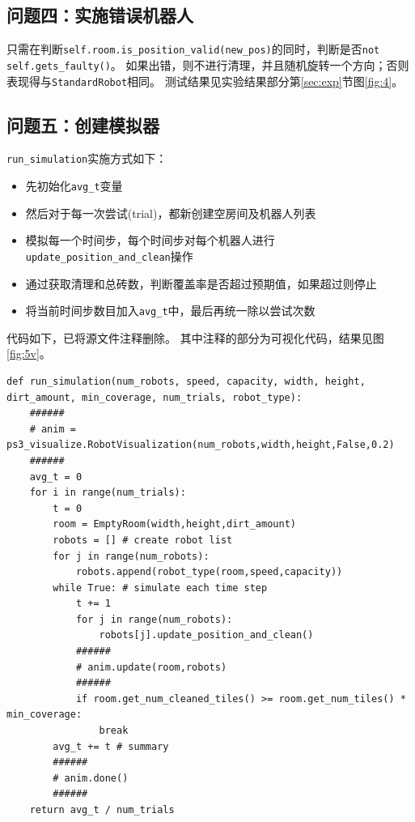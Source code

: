 \documentclass[logo,reportComp]{thesis}
\begin{document}
\subsection{问题四：实施错误机器人}
只需在判断\verb'self.room.is_position_valid(new_pos)'的同时，判断是否\verb'not self.gets_faulty()'。
如果出错，则不进行清理，并且随机旋转一个方向；否则表现得与\verb'StandardRobot'相同。
测试结果见实验结果部分第\ref{sec:exp}节图\ref{fig:4}。

\subsection{问题五：创建模拟器}
\verb'run_simulation'实施方式如下：
\begin{itemize}
    \item 先初始化\verb'avg_t'变量
    \item 然后对于每一次尝试(trial)，都新创建空房间及机器人列表
    \item 模拟每一个时间步，每个时间步对每个机器人进行\verb'update_position_and_clean'操作
    \item 通过获取清理和总砖数，判断覆盖率是否超过预期值，如果超过则停止
    \item 将当前时间步数目加入\verb'avg_t'中，最后再统一除以尝试次数
\end{itemize}

代码如下，已将源文件注释删除。
其中注释的部分为可视化代码，结果见图\ref{fig:5v}。
\begin{lstlisting}
def run_simulation(num_robots, speed, capacity, width, height, dirt_amount, min_coverage, num_trials, robot_type):
    ######
    # anim = ps3_visualize.RobotVisualization(num_robots,width,height,False,0.2)
    ######
    avg_t = 0
    for i in range(num_trials):
        t = 0
        room = EmptyRoom(width,height,dirt_amount)
        robots = [] # create robot list
        for j in range(num_robots):
            robots.append(robot_type(room,speed,capacity))
        while True: # simulate each time step
            t += 1
            for j in range(num_robots):
                robots[j].update_position_and_clean()
            ######
            # anim.update(room,robots)
            ######
            if room.get_num_cleaned_tiles() >= room.get_num_tiles() * min_coverage:
                break
        avg_t += t # summary
        ######
        # anim.done()
        ######
    return avg_t / num_trials
\end{lstlisting}
\end{document}
